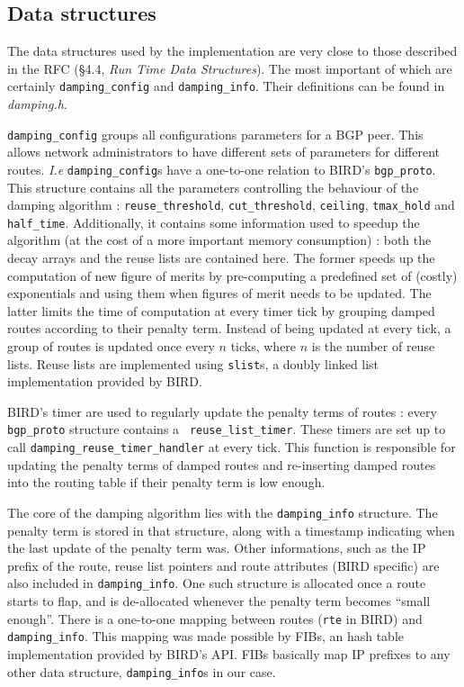 \documentclass[a4paper,english]{IEEEtran}
\begin{document}
\subsection{Data structures}

The data structures used by the implementation are very close to 
those described in the RFC (\S4.4, \textit{Run Time Data Structures}).
The most important of which are certainly {\tt\small damping\_config} and
{\tt\small damping\_info}.
Their definitions can be found in {\sl damping.h}.

{\tt\small damping\_config} groups all configurations parameters for a BGP peer.
This allows network administrators to have different sets of parameters for
different routes. {\it I.e} \texttt{\small damping\_config}s have a 
one-to-one relation to BIRD's \texttt{\small bgp\_proto}.
This structure contains all the parameters controlling the behaviour 
of the damping algorithm :
\texttt{\small reuse\_threshold}, \texttt{\small cut\_threshold}, 
\texttt{\small ceiling}, \texttt{\small tmax\_hold} and \texttt{\small half\_time}.
Additionally, it contains some information used to speedup the algorithm
(at the cost of a more important memory consumption) : both the decay
arrays and the reuse lists are contained here. The former speeds up the
computation of new figure of merits by pre-computing a predefined set
of (costly) exponentials and using them when figures of merit needs to 
be updated.
The latter limits the time of computation at every timer tick by 
grouping damped routes according to their penalty term.
Instead of being updated at every tick, a group of routes is updated 
once every $n$ ticks, where $n$ is the number of reuse lists.
Reuse lists are implemented using \texttt{\small slist}s, 
a doubly linked list implementation provided by BIRD.

BIRD's timer are used to regularly update the penalty terms of routes : 
every \texttt{\small bgp\_proto} structure contains a \texttt{\small 
reuse\_list\_timer}.
These timers are set up to call \texttt{\small damping\_reuse\_timer\_handler} 
at every tick.
This function is responsible for updating the penalty terms of 
damped routes and re-inserting damped routes into the routing table if their
penalty term is low enough.

The core of the damping algorithm lies with the \texttt{\small damping\_info} 
structure. The penalty term is stored in that structure, 
along with a timestamp indicating when the last update of the penalty term was.
Other informations, such as the IP prefix of the route, reuse list pointers 
and route attributes (BIRD specific) are also included in \texttt{\small damping\_info}.
One such structure is allocated once a route starts to flap, and is de-allocated 
whenever the penalty term becomes ``small enough''.
There is a one-to-one mapping between routes (\texttt{\small rte} in BIRD) 
and \texttt{\small damping\_info}. This mapping was made possible by FIBs, 
an hash table implementation provided by BIRD's API. FIBs basically map IP 
prefixes to any other data structure, {\tt\small damping\_info}s in our case.
\end{document}
